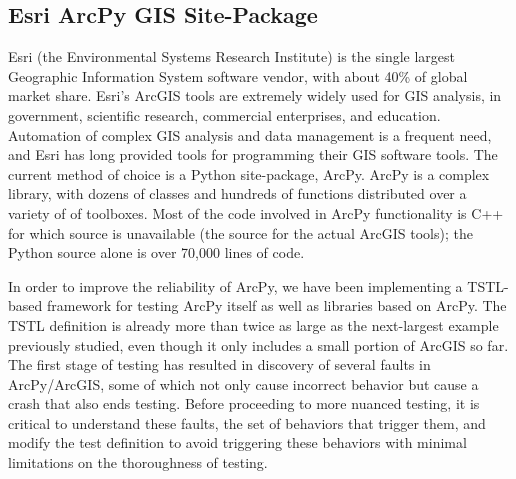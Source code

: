 \subsection{Esri ArcPy GIS Site-Package}

Esri (the Environmental Systems Research Institute) is the single
largest Geographic Information System software vendor, with about 40\%
of global market share.  Esri's ArcGIS tools are extremely widely
used for GIS analysis, in government, scientific research, commercial
enterprises, and education.  Automation of complex GIS analysis and
data management is a frequent need, and Esri has long provided tools
for programming their GIS software tools.  The current method of
choice is a Python site-package, ArcPy.  ArcPy is a complex library,
with dozens of classes and hundreds of functions distributed over
a variety of of toolboxes.  Most of the code involved in ArcPy
functionality is C++ for which source is unavailable (the source for
the actual ArcGIS tools); the Python source alone is over 70,000 lines
of code.

In order to improve the reliability of ArcPy, we have been
implementing a TSTL-based framework for testing ArcPy itself as well
as libraries based on ArcPy.  The TSTL definition is already more than
twice as large as the next-largest example previously studied, even
though it only includes a small portion of ArcGIS so far. The first
stage of testing has resulted in discovery of several faults in
ArcPy/ArcGIS, some of which not only cause incorrect behavior but
cause a crash that also ends testing.  Before proceeding to more
nuanced testing, it is critical to understand these faults, the set of
behaviors that trigger them, and modify the test definition to avoid
triggering these behaviors with minimal limitations on the thoroughness
of testing.

